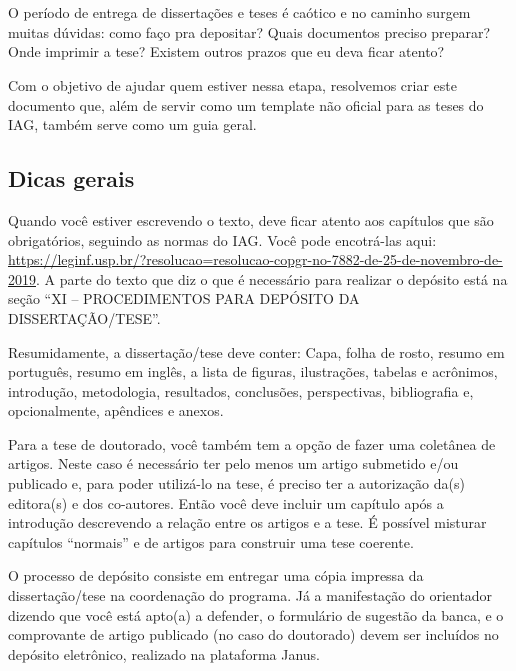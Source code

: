 \setcounter{page}{0}
\chapter{\chapternameintro}

  O período de entrega de dissertações e teses é caótico e no caminho surgem muitas dúvidas: como faço pra depositar? Quais documentos preciso preparar? Onde imprimir a tese? Existem outros prazos que eu deva ficar atento?

  Com o objetivo de ajudar quem estiver nessa etapa, resolvemos criar este documento que, além de servir como um template não oficial para as teses do IAG, também serve como um guia geral.

  \section{Dicas gerais}

    Quando você estiver escrevendo o texto, deve ficar atento aos capítulos que são obrigatórios, seguindo as normas do IAG. Você pode encotrá-las aqui: \url{https://leginf.usp.br/?resolucao=resolucao-copgr-no-7882-de-25-de-novembro-de-2019}. A parte do texto que diz o que é necessário para realizar o depósito está na seção ``XI – PROCEDIMENTOS PARA DEPÓSITO DA DISSERTAÇÃO/TESE''.

    Resumidamente, a dissertação/tese deve conter: Capa, folha de rosto, resumo em português, resumo em inglês, a lista de figuras, ilustrações, tabelas e acrônimos, introdução, metodologia, resultados, conclusões, perspectivas, bibliografia e, opcionalmente, apêndices e anexos.

    Para a tese de doutorado, você também tem a opção de fazer uma coletânea de artigos. Neste caso é necessário ter pelo menos um artigo submetido e/ou publicado e, para poder utilizá-lo na tese, é preciso ter a autorização da(s) editora(s) e dos co-autores. Então você deve incluir um capítulo após a introdução descrevendo a relação entre os artigos e a tese. É possível misturar capítulos ``normais'' e de artigos para construir uma tese coerente.

    O processo de depósito consiste em entregar uma cópia impressa da dissertação/tese na coordenação do programa. Já a manifestação do orientador dizendo que você está apto(a) a defender, o formulário de sugestão da banca, e o comprovante de artigo publicado (no caso do doutorado) devem ser incluídos no depósito eletrônico, realizado na plataforma Janus.


